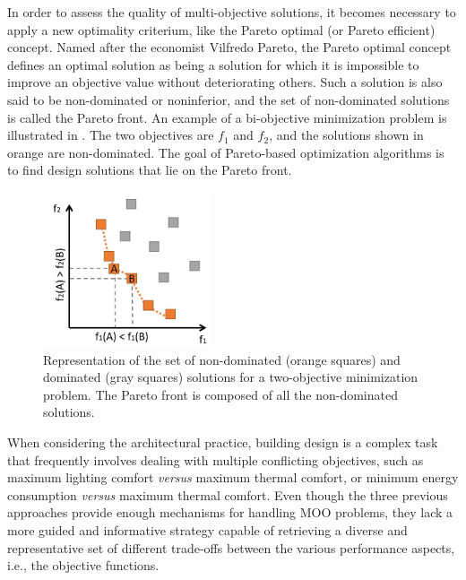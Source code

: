 	In order to assess the quality of multi-objective solutions, it becomes necessary to apply a new optimality criterium, like the Pareto optimal (or Pareto efficient) concept. Named after the economist Vilfredo Pareto, the Pareto optimal concept defines an optimal solution as being a solution for which it is impossible to improve an objective value without deteriorating others. Such a solution is also said to be non-dominated or noninferior, and the set of non-dominated solutions is called the Pareto front. An example of a bi-objective minimization problem is illustrated in . The two objectives are $f_1$ and $f_2$, and the solutions shown in orange are non-dominated. The goal of Pareto-based optimization algorithms is to find design solutions that lie on the Pareto front.
	
	\begin{figure}
		\centering
		\includegraphics[width=5cm]{Images/Background/pareto-front.JPG}
		\caption[Representation of a Pareto front example for a bi-objective optimization problem]{Representation of the set of non-dominated (orange squares) and dominated (gray squares) solutions for a two-objective minimization problem. The Pareto front is composed of all the non-dominated solutions.}
		\label{fig:paretofrontier}
	\end{figure}
	
	When considering the architectural practice, building design is a complex task that frequently involves dealing with multiple conflicting objectives, such as maximum lighting comfort \textit{versus} maximum thermal comfort, or minimum energy consumption \textit{versus} maximum thermal comfort. Even though the three previous approaches provide enough mechanisms for handling \ac{MOO} problems, they lack a more guided and informative strategy capable of retrieving a diverse and representative set of different trade-offs between the various performance aspects, i.e., the objective functions.
	
